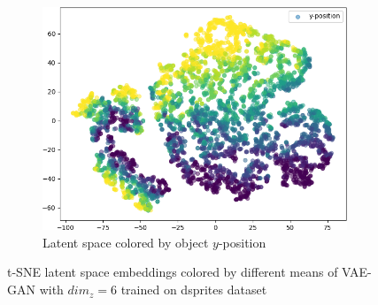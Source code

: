 \documentclass[11pt,a4paper]{article}
\begin{document}
\begin{figure}[H]
\begin{subfigure}{.19\textwidth}
\includegraphics[width=\textwidth]{images/latent_spaces/dsprites/vae_gan/embeddings_mu_4.png}
\caption{Latent space colored by object $y$-position}
\end{subfigure}
\caption[\ac{VAE}-\ac{GAN} Latent Space - dsprites]{\ac{t-SNE} latent space embeddings colored by different means of \ac{VAE}-\ac{GAN} with $dim_z=6$ trained on dsprites dataset}
\label{fig:vae_gan_latent_space_dsprites}
\end{figure}
\end{document}
